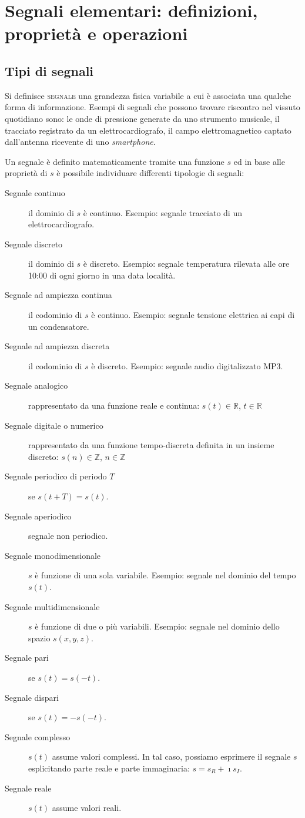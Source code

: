 \chapter{Segnali elementari: definizioni, proprietà e operazioni}
\label{ch:teoriasegnali-capitolo1}
\section{Tipi di segnali}
Si definisce \textsc{segnale} una grandezza fisica variabile a cui è associata una qualche forma di informazione. Esempi di segnali che possono trovare riscontro nel vissuto quotidiano sono: le onde di pressione generate da uno strumento musicale, il tracciato registrato da un elettrocardiografo, il campo elettromagnetico captato dall'antenna ricevente di uno \emph{smartphone}.

Un segnale è definito matematicamente tramite una funzione $s$ ed in base alle proprietà di $s$ è possibile individuare differenti tipologie di segnali:
\begin{description}
	\item[Segnale continuo] il dominio di $s$ è continuo. Esempio: segnale tracciato di un elettrocardiografo.
	\item[Segnale discreto] il dominio di $s$ è discreto. Esempio: segnale temperatura rilevata alle ore 10:00 di ogni giorno in una data località.
	\item[Segnale ad ampiezza continua] il codominio di $s$ è continuo. Esempio: segnale tensione elettrica ai capi di un condensatore.
	\item[Segnale ad ampiezza discreta] il codominio di $s$ è discreto. Esempio: segnale audio digitalizzato MP3.
	\item[Segnale analogico] rappresentato da una funzione reale e continua: $s(t)\in\mathbb{R}$, $t\in\mathbb{R}$
	\item[Segnale digitale o numerico] rappresentato da una funzione tempo-discreta definita in un insieme discreto: $s(n)\in\mathbb{Z}$, $n\in\mathbb{Z}$
	\item[Segnale periodico di periodo $T$] se $s(t+T)=s(t)$.
	\item[Segnale aperiodico] segnale non periodico.
	\item[Segnale monodimensionale] $s$ è funzione di una sola variabile. Esempio: segnale nel dominio del tempo $s(t)$.
	\item[Segnale multidimensionale] $s$ è funzione di due o più variabili. Esempio: segnale nel dominio dello spazio $s(x,y,z)$.
	\item[Segnale pari] se $s(t)=s(-t)$.
	\item[Segnale dispari] se $s(t)=-s(-t)$.
	\item[Segnale complesso] $s(t)$ assume valori complessi. In tal caso, possiamo esprimere il segnale $s$ esplicitando parte reale e parte immaginaria: $s=s_R+\imath s_I$.
	\item[Segnale reale] $s(t)$ assume valori reali.
\end{description}

